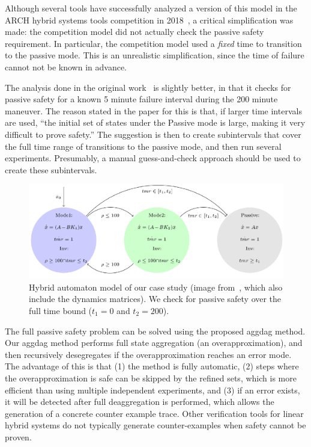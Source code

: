 Although several tools have successfully analyzed a version of this model in the ARCH hybrid systems tools competition in 2018~\cite{archcomp18linear}, a critical simplification was made: the competition model did not actually check the passive safety requirement. In particular, the competition model used a \emph{fixed} time to transition to the passive mode. This is an unrealistic simplification, since the time of failure cannot not be known in advance. 


The analysis done in the original work~\cite{chan2017verifying} is slightly better, in that it checks for passive safety for a known 5 minute failure interval during the 200 minute maneuver. The reason stated in the paper for this is that, if larger time intervals are used,
``the initial set of states under the Passive mode is large, making it very difficult to prove safety.'' The suggestion is then to create subintervals that cover the full time range of transitions to the passive mode, and then run several experiments. Presumably, a manual guess-and-check approach should be used to create these subintervals.


\begin{figure}[t]
\centerline{\includegraphics[width=0.9\columnwidth]{images/ha.png}}
\caption{Hybrid automaton model of our case study (image from~\cite{chan2017verifying}, which also include the dynamics matrices). We check for passive safety over the full time bound ($t_1=0$ and $t_2=200$).}
\label{fig:ha}
\end{figure}



The full passive safety problem can be solved using the proposed aggdag method. Our aggdag method performs full state aggregation (an overapproximation), and then recursively desegregates if the overapproximation reaches an error mode. The advantage of this is that (1) the method is fully automatic, (2) steps where the overapproximation is safe can be skipped by the refined sets, which is more efficient than using multiple independent experiments, and (3) if an error exists, it will be detected after full deaggregation is performed, which allows the generation of a concrete counter example trace. Other verification tools for linear hybrid systems do not typically generate counter-examples when safety cannot be proven.

